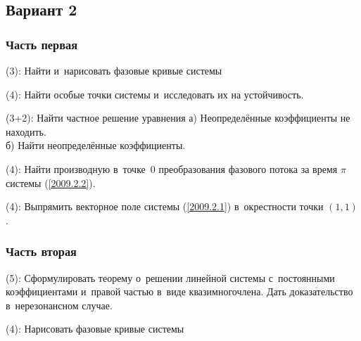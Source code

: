 \documentclass[a4paper]{article}
\newcommand{\skill}[1]{\textsf{(#1):}}
\begin{document}
\subsection{Вариант 2}

\subsubsection{Часть первая}

\begin{problem}
\skill{3} Найти и~нарисовать фазовые кривые системы 
\end{problem}

\begin{problem}
\skill{4} Найти особые точки системы 
 и~исследовать их на устойчивость.
\end{problem}

\begin{problem}
\skill{3+2} Найти частное решение уравнения 
а) Неопределённые коэффициенты не находить.\\
б) Найти неопределённые коэффициенты.
\end{problem}

\begin{problem}
\skill{4} Найти производную в~точке~$0$ преобразования фазового потока за время $\pi$ системы (\ref{2009.2.2}).
\end{problem}

\begin{problem}
\skill{4} Выпрямить векторное поле системы (\ref{2009.2.1}) в~окрестности точки $(1,1)$.
\end{problem}


\subsubsection{Часть вторая}

\begin{problem}
\skill{5} Сформулировать теорему о~решении линейной системы с~постоянными коэффициентами и~правой частью в~виде
квазимногочлена. Дать доказательство в~нерезонансном случае.
\end{problem}

\begin{problem}
\skill{4} Нарисовать фазовые кривые системы 
\end{problem}
\end{document}
